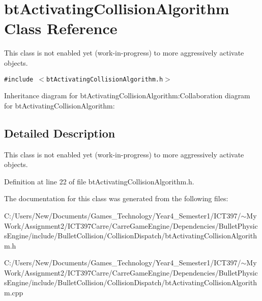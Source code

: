\hypertarget{classbt_activating_collision_algorithm}{
\section{btActivatingCollisionAlgorithm Class Reference}
\label{classbt_activating_collision_algorithm}
}
This class is not enabled yet (work-in-progress) to more aggressively activate objects.  


{\tt \#include $<$btActivatingCollisionAlgorithm.h$>$}

Inheritance diagram for btActivatingCollisionAlgorithm:Collaboration diagram for btActivatingCollisionAlgorithm:

\subsection{Detailed Description}
This class is not enabled yet (work-in-progress) to more aggressively activate objects. 

Definition at line 22 of file btActivatingCollisionAlgorithm.h.

The documentation for this class was generated from the following files:\begin{CompactItemize}
\item 
C:/Users/New/Documents/Games\_\-Technology/Year4\_\-Semester1/ICT397/$\sim$My Work/Assignment2/ICT397Carre/CarreGameEngine/Dependencies/BulletPhysicsEngine/include/BulletCollision/CollisionDispatch/btActivatingCollisionAlgorithm.h\item 
C:/Users/New/Documents/Games\_\-Technology/Year4\_\-Semester1/ICT397/$\sim$My Work/Assignment2/ICT397Carre/CarreGameEngine/Dependencies/BulletPhysicsEngine/include/BulletCollision/CollisionDispatch/btActivatingCollisionAlgorithm.cpp\end{CompactItemize}
